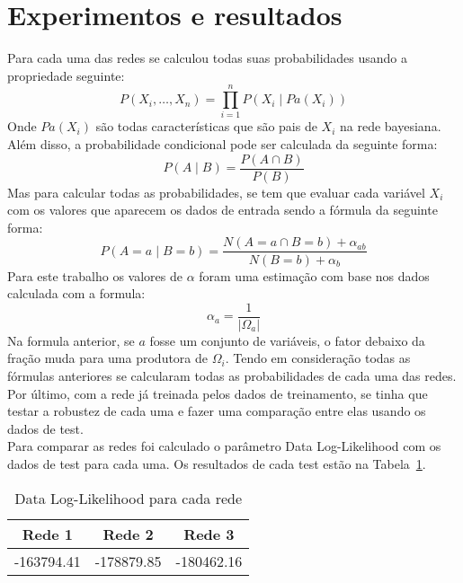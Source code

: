 \section{Experimentos e resultados}

Para cada uma das redes se calculou todas suas probabilidades usando a propriedade seguinte:
	\[ P( X_i , \ldots , X_n ) = \prod_{i=1}^{n} P( X_i \mid {Pa}( X_i ) ) \]
Onde ${Pa}( X_i )$ são todas características que são pais de $X_i$ na rede bayesiana. Além disso, a probabilidade condicional pode ser calculada da seguinte forma:
	\[ P( A \mid B ) = \frac{ P( A \cap B ) }{ P( B ) }\]
Mas para calcular todas as probabilidades, se tem que evaluar cada variável $X_i$ com os valores que aparecem os dados de entrada sendo a fórmula da seguinte forma:
	\[ P( A = a \mid B = b ) = \frac{ N( A = a \cap B = b ) + \alpha_{ab} }{N( B = b ) + \alpha_b } \]
Para este trabalho os valores de $\alpha$ foram uma estimação com base nos dados calculada com a formula:
	\[ \alpha_{a} = \frac{ 1 }{ |\Omega_a|} \]
Na formula anterior, se $a$ fosse um conjunto de variáveis, o fator debaixo da fração muda para uma produtora de $\Omega_i$.
Tendo em consideração todas as fórmulas anteriores se calcularam todas as probabilidades de cada uma das redes.
\\
Por último, com a rede já treinada pelos dados de treinamento, se tinha que testar a robustez de cada uma e fazer uma comparação entre elas usando os dados de test.
\\
Para comparar as redes foi calculado o parâmetro Data Log-Likelihood com os dados de test para cada uma. Os resultados de cada test estão na Tabela~\ref{tab:loglike}.

	\begin{table}[ h ]
		\centering
		\begin{tabular}{ | c | c | c | }
			\hline
			Rede 1 & Rede 2 & Rede 3 \\ \hline
			-163794.41 & -178879.85 & -180462.16 \\ \hline
		\end{tabular}
		\caption{Data Log-Likelihood para cada rede}
		\label{tab:loglike}
	\end{table}

\clearpage